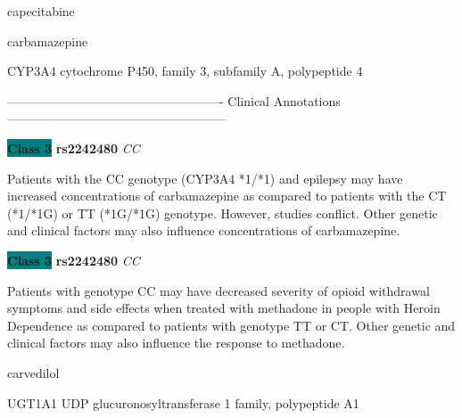 \documentclass{resume} %
\begin{document}
\begin{rSection}{ capecitabine }
\end{rSection}\begin{rSection}{ carbamazepine }
\item[]

\begin{rSubsection}{ CYP3A4 }{ cytochrome P450, family 3, subfamily A, polypeptide 4 }{}{}
\item[]

\item[] ---------------------------------------------------- Clinical Annotations -----------------------------------------------------\newline
\item \textbf{\colorbox{teal} {Class 3}} \textbf{ rs2242480 } \textit{ CC }
\item[] Patients with the CC genotype (CYP3A4 *1/*1) and epilepsy may have increased concentrations of carbamazepine as compared to patients with the CT (*1/*1G) or TT (*1G/*1G) genotype. However, studies conflict. Other genetic and clinical factors may also influence concentrations of carbamazepine.\item \textbf{\colorbox{teal} {Class 3}} \textbf{ rs2242480 } \textit{ CC }
\item[] Patients with genotype CC may have decreased severity of opioid withdrawal symptoms and side effects when treated with methadone in people with Heroin Dependence as compared to patients with genotype TT or CT. Other genetic and clinical factors may also influence the response to methadone.
\end{rSubsection}

\end{rSection}\begin{rSection}{ carvedilol }
\item[]

\begin{rSubsection}{ UGT1A1 }{ UDP glucuronosyltransferase 1 family, polypeptide A1 }{}{}
\item[]


\end{rSubsection}
\end{rSection}
\end{document}
